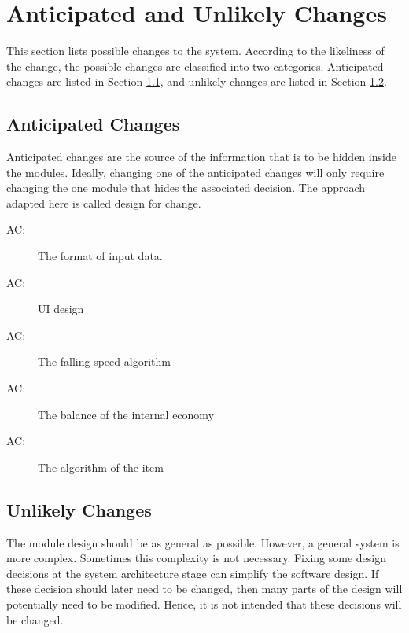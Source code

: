 \documentclass[12pt, titlepage]{article}
\newcounter{acnum}
\newcommand{\actheacnum}{AC\theacnum}
\begin{document}
\section{Anticipated and Unlikely Changes} \label{SecChange}

This section lists possible changes to the system. According to the likeliness
of the change, the possible changes are classified into two
categories. Anticipated changes are listed in Section \ref{SecAchange}, and
unlikely changes are listed in Section \ref{SecUchange}.

\subsection{Anticipated Changes} \label{SecAchange}

Anticipated changes are the source of the information that is to be hidden
inside the modules. Ideally, changing one of the anticipated changes will only
require changing the one module that hides the associated decision. The approach
adapted here is called design for
change.

\begin{description}
\item[ \actheacnum \label{acInput}:]The format of input data.
\item[ \actheacnum \label{acUI}:]  UI design
\item[ \actheacnum \label{acFalling}:] The falling speed algorithm 
\item[ \actheacnum \label{acBalance}:] The balance of the internal economy 
\item[ \actheacnum \label{acitem}:] The algorithm of the item
\end{description}

\subsection{Unlikely Changes} \label{SecUchange}

The module design should be as general as possible. However, a general system is
more complex. Sometimes this complexity is not necessary. Fixing some design
decisions at the system architecture stage can simplify the software design. If
these decision should later need to be changed, then many parts of the design
will potentially need to be modified. Hence, it is not intended that these
decisions will be changed.
\end{document}
